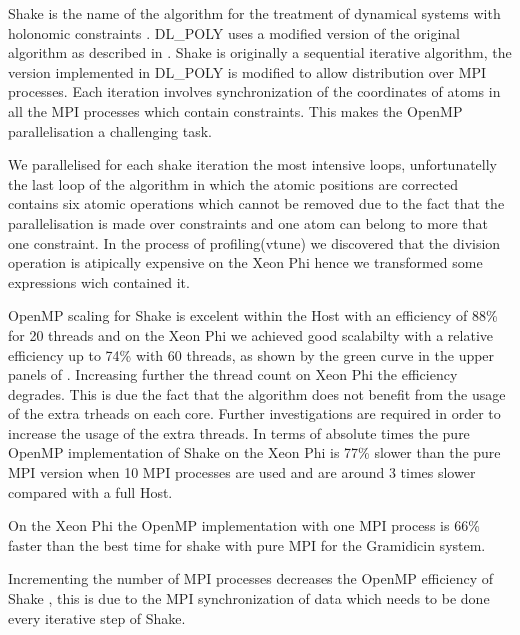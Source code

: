 \par{Shake is the name of the algorithm for the treatment of dynamical systems with holonomic constraints  
\cite{Ryckaert1977}. DL\_POLY uses a modified version of the original algorithm as described in \cite{Smith1994a}. 
Shake is originally a sequential iterative algorithm, the version implemented in DL\_POLY is modified to allow distribution over 
MPI processes. Each iteration involves synchronization of the coordinates of atoms in all the MPI processes which contain
constraints. This makes the OpenMP parallelisation a challenging task.}

\par{We parallelised for each shake iteration the most intensive loops, unfortunatelly the last loop of the algorithm in which 
the atomic positions are corrected contains six atomic operations which cannot be removed due to the fact that the 
parallelisation is made over constraints and one atom can belong to more that one constraint. In the process of profiling(vtune) 
we discovered that the division operation is atipically expensive on the Xeon Phi hence we transformed some expressions wich 
contained it.}

\par{OpenMP scaling for Shake is excelent within the Host with an efficiency of 88\% for 20 threads and on the Xeon Phi we
achieved good scalabilty with a relative efficiency up to 74\% with 60 threads, as shown by the green curve  in the upper panels
of . Increasing further the thread count on Xeon Phi the efficiency degrades. This is due the fact that the 
algorithm does not benefit from the usage of the extra trheads on each core. Further investigations are required in order to 
increase the usage of the extra threads. In terms of absolute times the pure OpenMP implementation of Shake on the Xeon Phi is 
77\% slower than the pure MPI version when 10 MPI processes are used and are around 3 times slower compared with a full Host.}

\par{On the Xeon Phi the OpenMP implementation with one MPI process is 66\% faster than the best time for shake with pure MPI for 
the Gramidicin system.}

\par{Incrementing the number of MPI processes decreases the OpenMP efficiency of Shake , this is due to the MPI 
synchronization of data which needs to be done every iterative step of Shake.} 
